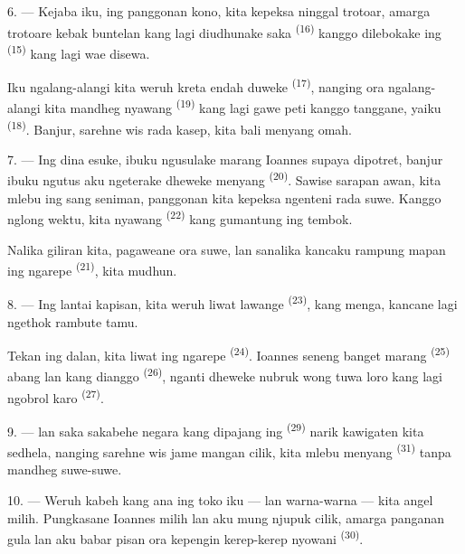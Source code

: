 6. --- Kejaba iku, ing panggonan kono, kita kepeksa ninggal trotoar,
amarga trotoare kebak buntelan kang lagi diudhunake saka  \textsuperscript{(16)} kanggo dilebokake ing 
\textsuperscript{(15)} kang lagi wae disewa.

Iku ngalang-alangi kita weruh kreta endah duweke  \textsuperscript{(17)}, nanging ora ngalang-alangi kita mandheg
nyawang  \textsuperscript{(19)} kang lagi gawe peti
kanggo tanggane, yaiku 
\textsuperscript{(18)}. Banjur, sarehne wis rada kasep, kita bali menyang
omah.

\VUsaut{3.0mm}

7. --- Ing dina esuke, ibuku ngusulake marang Ioannes supaya dipotret,
banjur ibuku ngutus aku ngeterake dheweke menyang  \textsuperscript{(20)}. Sawise sarapan awan, kita mlebu ing
 sang seniman, panggonan kita kepeksa ngenteni rada
suwe. Kanggo nglong wektu, kita nyawang 
\textsuperscript{(22)} kang gumantung ing tembok.

Nalika giliran kita, pagaweane ora suwe, lan sanalika kancaku rampung
mapan ing ngarepe  \textsuperscript{(21)}, kita mudhun.

8. --- Ing lantai kapisan, kita weruh liwat lawange  \textsuperscript{(23)}, kang menga, kancane lagi ngethok rambute
tamu.

Tekan ing dalan, kita liwat ing ngarepe 
\textsuperscript{(24)}. Ioannes seneng banget marang 
\textsuperscript{(25)} abang lan  kang dianggo
 \textsuperscript{(26)}, nganti dheweke nubruk wong
tuwa loro kang lagi ngobrol karo 
\textsuperscript{(27)}.

\VUsaut{3.0mm}

9. ---  lan  saka sakabehe
negara kang dipajang ing  
\textsuperscript{(29)} narik kawigaten kita sedhela, nanging sarehne wis
jame mangan cilik, kita mlebu menyang 
\textsuperscript{(31)} tanpa mandheg suwe-suwe.

10. --- Weruh kabeh  kang ana ing toko iku —
 lan warna-warna  —
kita angel milih. Pungkasane Ioannes milih  lan aku
mung njupuk  cilik, amarga panganan gula  lan aku babar pisan ora kepengin kerep-kerep nyowani
 \textsuperscript{(30)}.

